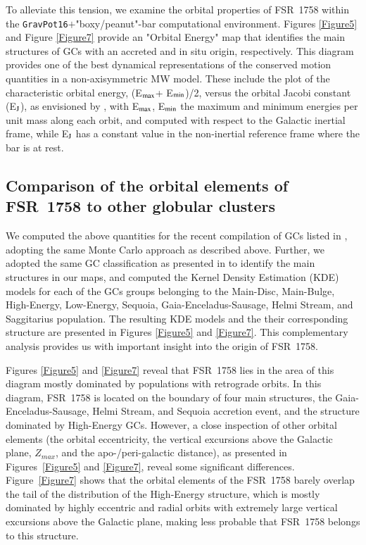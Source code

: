 \documentclass[longauth]{aa} %
\begin{document}
To alleviate this tension, we examine the orbital properties of FSR~1758 within the \texttt{GravPot16}$+$"boxy/peanut"-bar computational environment. Figures \ref{Figure5} and Figure \ref{Figure7} provide an "Orbital Energy" map that identifies the main structures of GCs with an accreted and in situ origin, respectively. This diagram provides one of the best dynamical representations of the conserved motion quantities in a non-axisymmetric MW model. These include the plot of the characteristic orbital energy, (E$_{\rm max}$+ E$_{\rm min}$)/2, versus the orbital Jacobi constant (E$_{\rm J}$), as envisioned by \citet{Moreno2015}, with E$_{\rm max}$, E$_{\rm min}$ the maximum and minimum energies per unit mass along each orbit, and computed with respect to the Galactic inertial frame, while E$_{\rm J}$ has a constant value in the non-inertial reference frame where the bar is at rest. 

\subsection{Comparison of the orbital elements of FSR~1758 to other globular clusters}

We computed the above quantities for the recent compilation of GCs listed in \citet{Vasiliev2021},  adopting the same Monte Carlo approach as described above. Further, we adopted the same GC classification as presented in \citet{Massari2019} to identify the main structures in our maps, and computed the Kernel Density Estimation (KDE) models for each of  the GCs groups belonging to the Main-Disc, Main-Bulge, High-Energy, Low-Energy, Sequoia, Gaia-Enceladus-Sausage, Helmi Stream, and Saggitarius population. The resulting KDE models and the their corresponding structure are presented in Figures \ref{Figure5} and \ref{Figure7}. This complementary analysis provides us with important insight into the origin of FSR~1758. 

 Figures \ref{Figure5} and \ref{Figure7} reveal that FSR~1758 lies in the area of this diagram mostly dominated by  populations with retrograde orbits. In this diagram, FSR~1758 is located on the boundary of four main structures, the Gaia-Enceladus-Sausage, Helmi Stream, and Sequoia accretion event, and the structure dominated by High-Energy GCs. However, a close inspection of other orbital elements (the orbital eccentricity, the vertical excursions above the Galactic plane, $Z_{max}$, and the apo-/peri-galactic distance), as presented in Figures~\ref{Figure5} and \ref{Figure7},  reveal some significant differences. Figure~\ref{Figure7} shows that the orbital elements of the FSR~1758 barely overlap the tail of the distribution of the High-Energy structure, which is mostly dominated by highly eccentric and radial orbits with extremely large vertical excursions above the Galactic plane, making less probable that FSR~1758 belongs to this structure. 
 
\end{document}
